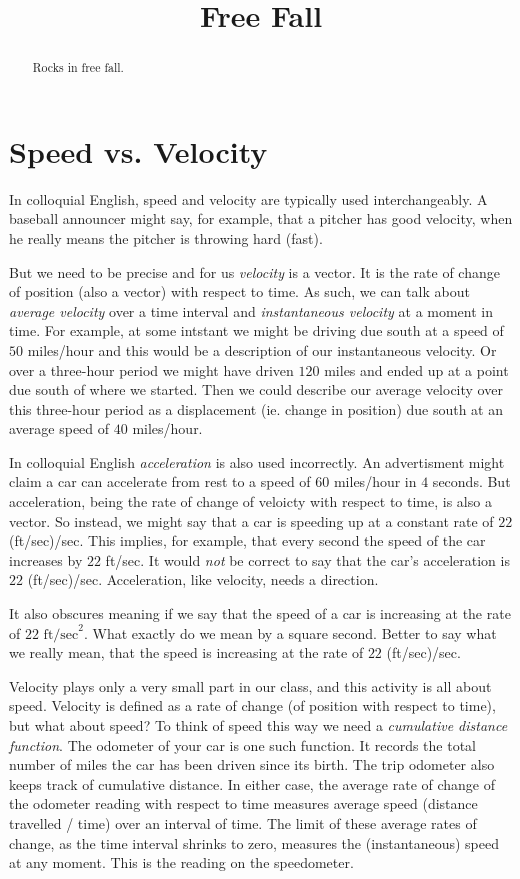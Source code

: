 \documentclass{ximera}
\title{Free Fall}
\begin{document}
\begin{abstract}
Rocks in free fall.
\end{abstract}
\maketitle


\section{Speed vs. Velocity}

In colloquial English, speed and velocity are typically used interchangeably. A baseball announcer might say, for example, that a pitcher has good velocity, when he really means the pitcher is throwing hard (fast).

But we need to be precise and for us \emph{velocity} is a vector. It is the rate of change of position (also a vector) with respect to time. As such, we can talk about \emph{average velocity} over a time interval and \emph{instantaneous velocity} at a moment in time. For example, at some intstant we might be driving due south at a speed of $50$ miles/hour and this would be a description of our instantaneous velocity. Or over a three-hour period we might have driven $120$ miles and ended up at a point due south of where we started. Then we could describe our average velocity over this three-hour period as a displacement (ie. change in position) due south at an average speed of $40$ miles/hour.

In colloquial English \emph{acceleration} is also used incorrectly. An advertisment might claim a car can accelerate from rest to a speed of $60$ miles/hour in $4$ seconds. But acceleration, being the rate of change of veloicty with respect to time, is also a vector. So instead, we might say that a car is speeding up at a constant rate of $22$ (ft/sec)/sec. This implies, for example, that every second the speed of the car increases by $22$ ft/sec. It would \emph{not} be correct to say that the car's acceleration is $22$ (ft/sec)/sec. Acceleration, like velocity, needs a direction.

It also obscures meaning if we say that the speed of a car is increasing at the rate of $22\text{ ft/sec}^2$. What exactly do we mean by a square second. Better to say what we really mean, that the speed is increasing at the rate of $22$ (ft/sec)/sec.

Velocity plays only a very small part in our class, and this activity is all about speed. Velocity is defined as a rate of change (of position with respect to time), but what about speed? To think of speed this way we need a \emph{cumulative distance function}. The odometer of your car is one such function. It records the total number of miles the car has been driven since its birth. The trip odometer also keeps track of cumulative distance. In either case, the average rate of change of the odometer reading with respect to time measures average speed (distance travelled / time) over an interval of time. The limit of these average rates of change, as the time interval shrinks to zero, measures the (instantaneous) speed at any moment. This is the reading on the speedometer.
\end{document}
